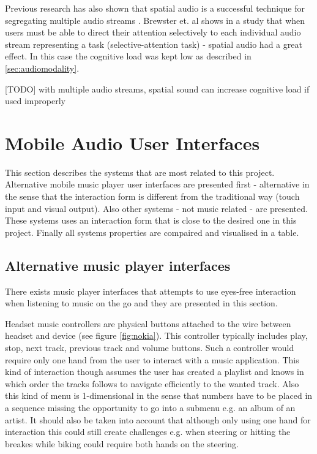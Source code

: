 Previous research has also shown that spatial audio is a successful technique for segregating multiple audio streams \cite{schmandt_audiostreamer:_1995, walker_spatial_2000}. Brewster et. al \cite{vazquez-alvarez_eyes-free_2011} shows in a study that when users must be able to direct their attention selectively to each individual audio stream representing a task (selective-attention task) - spatial audio had a great effect. In this case the cognitive load was kept low as described in \ref{sec:audiomodality}.

[TODO]
with multiple audio streams, spatial sound can increase cognitive load if used improperly \cite{vazquez-alvarez_eyes-free_2011}


\section{Mobile Audio User Interfaces}
This section describes the systems that are most related to this project. Alternative mobile music player user interfaces are presented first - alternative in the sense that the interaction form is different from the traditional way (touch input and visual output). Also other systems - not music related - are presented. These systems uses an interaction form that is close to the desired one in this project. Finally all systems properties are compaired and visualised in a table.

\subsection{Alternative music player interfaces}
\label{sec:alternativemusicuis}
There exists music player interfaces that attempts to use eyes-free interaction when listening to music on the go and they are presented in this section.

Headset music controllers are physical buttons attached to the wire between headset and device (see figure \ref{fig:nokia}). This controller typically includes play, stop, next track, previous track and volume buttons. Such a controller would require only one hand from the user to interact with a music application. This kind of interaction though assumes the user has created a playlist and knows in which order the tracks follows to navigate efficiently to the wanted track. Also this kind of menu is 1-dimensional in the sense that numbers have to be placed in a sequence missing the opportunity to go into a submenu e.g. an album of an artist. It should also be taken into account that although only using one hand for interaction this could still create challenges e.g. when steering or hitting the breakes while biking could require both hands on the steering.

